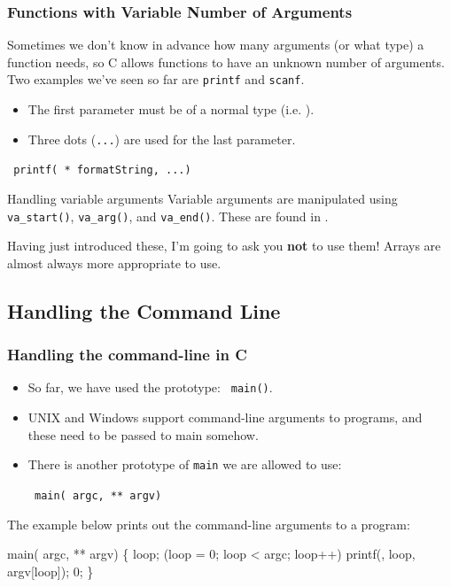 \documentclass[smaller,handout,table]{beamer}
\begin{document}
\begin{frame}
\frametitle{Functions with Variable Number of Arguments}
Sometimes we don't know in advance how many arguments (or what type) a function needs, so C allows functions to have an unknown number of arguments. Two examples we've seen so far are {\tt printf} and {\tt scanf}.

\begin{itemize}
\item The first parameter must be of a normal type (i.e. ).
\item Three dots ({\tt ...}) are used for the last parameter.
\end{itemize}
\begin{center}
{\tt {} printf( * formatString, ...)}
\end{center}
\begin{block}{Handling variable arguments}
Variable arguments are manipulated using {\tt va\_start()}, {\tt va\_arg()},
and {\tt va\_end()}. These are found in .
\end{block}

\begin{alertblock}{}
Having just introduced these, I'm going to ask you {\bf not} to use them! Arrays are almost always more appropriate to use.
\end{alertblock}
\end{frame}


\subsection{Handling the Command Line}
\begin{frame}[fragile]
\frametitle{Handling the command-line in C}
\begin{itemize}
\item So far, we have used the prototype: {\tt {} main()}.
\item UNIX and Windows support command-line arguments to programs, and these need to be passed to main somehow.
\item There is another prototype of {\tt main} we are allowed to use:\\
\begin{center}
\tt {} main( argc,  ** argv)
\end{center}
\end{itemize}
The example below prints out the command-line arguments to a program:
\vspace{-0.1in}
\begin{semiverbatim}
\small
{} 

 main( argc,  ** argv)
\{
    loop;
    (loop = 0; loop < argc; loop++)
      printf(, loop, argv[loop]);
    0;
\}
\end{semiverbatim}
\end{frame}
\end{document}
